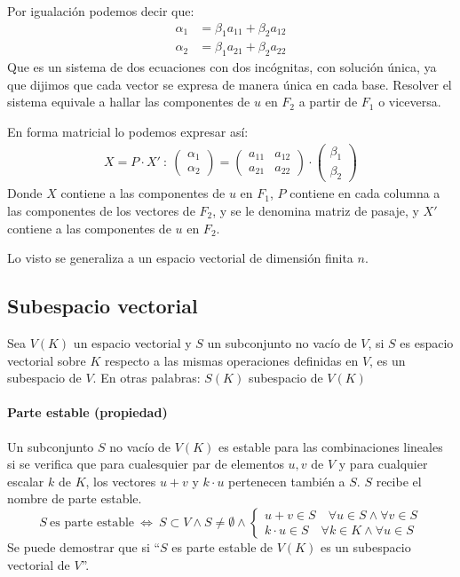 Por igualación podemos decir que:
\begin{align*}
  \alpha_1 &= \beta_1 a_{11} + \beta_2 a_{12} \\ 
  \alpha_2 &= \beta_1 a_{21} + \beta_2 a_{22}
\end{align*}
Que es un sistema de dos ecuaciones con dos incógnitas, con solución única, ya que dijimos que cada vector se expresa de manera única en cada base. Resolver el sistema equivale a hallar las componentes de \(u\) en \(F_2\) a partir de \(F_1\) o viceversa.

En forma matricial lo podemos expresar así:
\begin{align*}
  X = P \cdot X' ~ : ~ \begin{pmatrix}
    \alpha_1 \\ \alpha_2
  \end{pmatrix} = \begin{pmatrix}
    a_{11} & a_{12} \\ 
    a_{21} & a_{22}
  \end{pmatrix} \cdot \begin{pmatrix}
    \beta_1 \\ \beta_2
  \end{pmatrix}
\end{align*}
Donde \(X\) contiene a las componentes de \(u\) en \(F_1\), \(P\) contiene en cada columna a las componentes de los vectores de \(F_2\), y se le denomina matriz de pasaje, y \(X'\) contiene a las componentes de \(u\) en \(F_2\).

Lo visto se generaliza a un espacio vectorial de dimensión finita \(n\).

\subsection{Subespacio vectorial}

Sea \(V(K)\) un espacio vectorial y \(S\) un subconjunto no vacío de \(V\), si \(S\) es espacio vectorial sobre \(K\) respecto a las mismas operaciones definidas en \(V\), es un subespacio de \(V\). En otras palabras: \(S(K)\) subespacio de \(V(K)\)

\paragraph{Parte estable (propiedad)}

Un subconjunto \(S\) no vacío de \(V(K)\) es estable para las combinaciones lineales si se verifica que para cualesquier par de elementos \(u,v\) de \(V\) y para cualquier escalar \(k\) de \(K\), los vectores \(u+v\) y \(k\cdot u\) pertenecen también a \(S\). \(S\) recibe el nombre de parte estable.
\[
  S ~ \text{es parte estable} ~ \Longleftrightarrow ~ S \subset V \land S \neq \emptyset \land \begin{cases}
    u + v \in S \quad \forall u \in S \land \forall v \in S\\
    k \cdot u \in S \quad \forall k \in K \land \forall u \in S
  \end{cases}
\]
Se puede demostrar que si ``\(S\) es parte estable de \(V(K)\) es un subespacio vectorial de \(V\)''.

